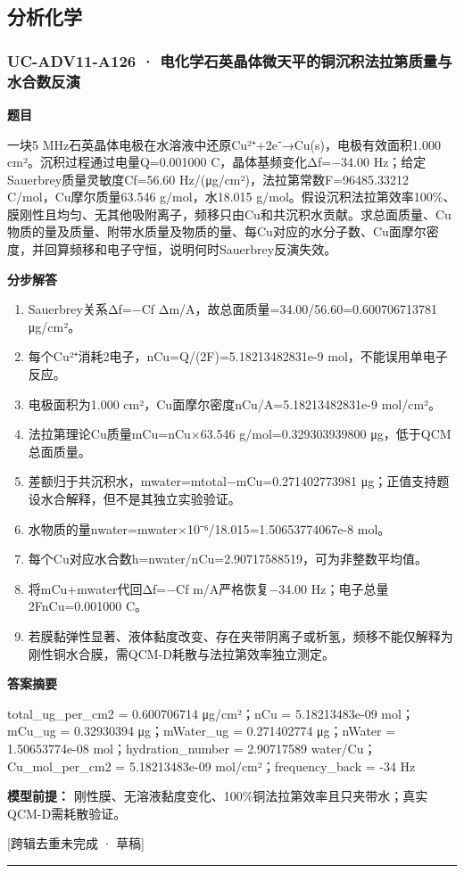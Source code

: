 \documentclass[UTF8,11pt,a4paper]{ctexart}
\begin{document}
\subsection*{分析化学}
\subsubsection*{UC-ADV11-A126 · 电化学石英晶体微天平的铜沉积法拉第质量与水合数反演}
\noindent\textbf{题目}\par
一块5 MHz石英晶体电极在水溶液中还原Cu²⁺+2e⁻→Cu(s)，电极有效面积1.000 cm²。沉积过程通过电量Q=0.001000 C，晶体基频变化Δf=−34.00 Hz；给定Sauerbrey质量灵敏度Cf=56.60 Hz/(μg/cm²)，法拉第常数F=96485.33212 C/mol，Cu摩尔质量63.546 g/mol，水18.015 g/mol。假设沉积法拉第效率100\%、膜刚性且均匀、无其他吸附离子，频移只由Cu和共沉积水贡献。求总面质量、Cu物质的量及质量、附带水质量及物质的量、每Cu对应的水分子数、Cu面摩尔密度，并回算频移和电子守恒，说明何时Sauerbrey反演失效。\par
\medskip\noindent\textbf{分步解答}
\begin{enumerate}
\item Sauerbrey关系Δf=−Cf Δm/A，故总面质量=34.00/56.60=0.600706713781 μg/cm²。
\item 每个Cu²⁺消耗2电子，nCu=Q/(2F)=5.18213482831e-9 mol，不能误用单电子反应。
\item 电极面积为1.000 cm²，Cu面摩尔密度nCu/A=5.18213482831e-9 mol/cm²。
\item 法拉第理论Cu质量mCu=nCu×63.546 g/mol=0.329303939800 μg，低于QCM总面质量。
\item 差额归于共沉积水，mwater=mtotal−mCu=0.271402773981 μg；正值支持题设水合解释，但不是其独立实验验证。
\item 水物质的量nwater=mwater×10⁻⁶/18.015=1.50653774067e-8 mol。
\item 每个Cu对应水合数h=nwater/nCu=2.90717588519，可为非整数平均值。
\item 将mCu+mwater代回Δf=−Cf m/A严格恢复−34.00 Hz；电子总量2FnCu=0.001000 C。
\item 若膜黏弹性显著、液体黏度改变、存在夹带阴离子或析氢，频移不能仅解释为刚性铜水合膜，需QCM-D耗散与法拉第效率独立测定。
\end{enumerate}
\noindent\textbf{答案摘要}\par
total\_ug\_per\_cm2 = 0.600706714 μg/cm²；nCu = 5.18213483e-09 mol；mCu\_ug = 0.32930394 μg；mWater\_ug = 0.271402774 μg；nWater = 1.50653774e-08 mol；hydration\_number = 2.90717589 water/Cu；Cu\_mol\_per\_cm2 = 5.18213483e-09 mol/cm²；frequency\_back = -34 Hz\par
\noindent\textbf{模型前提：}
刚性膜、无溶液黏度变化、100\%铜法拉第效率且只夹带水；真实QCM-D需耗散验证。\par
\noindent\textcolor{red!65!black}{[跨辑去重未完成 · 草稿]} \par
\medskip\hrule\medskip
{}
\end{document}
